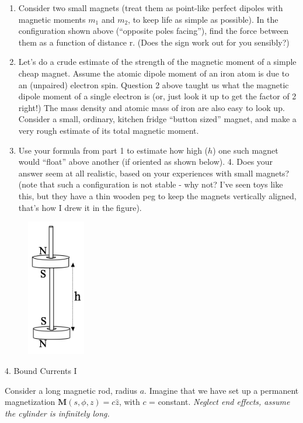 \documentclass[11pt]{article}
\def\tightlist{}
\begin{document}
\begin{enumerate}
\def\labelenumi{\arabic{enumi}.}
\tightlist
\item
  Consider two small magnets (treat them as point-like perfect dipoles
  with magnetic moments \(m_1\) and \(m_2\), to keep life as simple as
  possible). In the configuration shown above (``opposite poles
  facing''), find the force between them as a function of distance r.
  (Does the sign work out for you sensibly?)
\item
  Let's do a crude estimate of the strength of the magnetic moment of a
  simple cheap magnet. Assume the atomic dipole moment of an iron atom
  is due to an (unpaired) electron spin. Question 2 above taught us what
  the magnetic dipole moment of a single electron is (or, just look it
  up to get the factor of 2 right!) The mass density and atomic mass of
  iron are also easy to look up. Consider a small, ordinary, kitchen
  fridge ``button sized'' magnet, and make a very rough estimate of its
  total magnetic moment.
\item
  Use your formula from part 1 to estimate how high (\(h\)) one such
  magnet would ``float'' above another (if oriented as shown below). 4.
  Does your answer seem at all realistic, based on your experiences with
  small magnets? (note that such a configuration is not stable - why
  not? I've seen toys like this, but they have a thin wooden peg to keep
  the magnets vertically aligned, that's how I drew it in the figure).
\end{enumerate}

\begin{figure}[htbp]
\centering
\includegraphics[width=1in]{./images/hw11/two_magnets.png}
\end{figure}

{\Large 4. Bound Currents I}\label{bound-currents-i}

Consider a long magnetic rod, radius \(a\). Imagine that we have set up
a permanent magnetization \(\mathbf{M}(s,\phi,z) = c \hat{z}\), with \(c\) =
constant. \emph{Neglect end effects, assume the cylinder is infinitely
long.}
\end{document}
